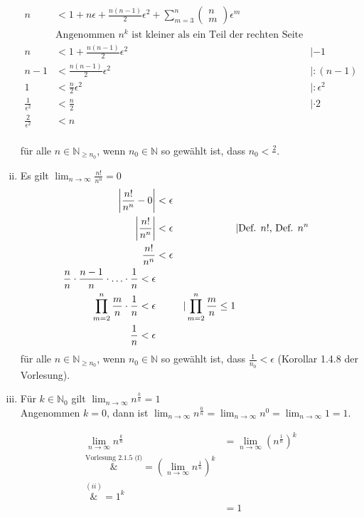 \documentclass{article}
\begin{document}
\begin{enumerate}[(i)]
\begin{align*}
    n &< 1 + n\epsilon + \frac{n(n - 1)}{2} \epsilon^2 + \sum\limits_{m = 3}^n \begin{pmatrix}n \\ m \end{pmatrix} \epsilon^m \\
                  & \text{Angenommen $n^k$ ist kleiner als ein Teil der rechten Seite} \\
    n &< 1 + \frac{n(n - 1)}{2} \epsilon^2 && | - 1 \\
    n - 1  &< \frac{n(n - 1)}{2} \epsilon^2 && | : (n - 1) \\
    1  &< \frac{n}{2} \epsilon^2 && | : \epsilon^2 \\
    \frac{1}{\epsilon^2}  &< \frac{n}{2} && | \cdot 2 \\
    \frac{2}{\epsilon^2}  &< n \\
  \end{align*}

  für alle $n \in \mathbb{N}_{\geq n_0}$, wenn $n_0 \in \mathbb{N}$ so gewählt ist, dass $n_0 < \frac{2}{}$.
\item Es gilt $\lim_{n \to \infty} \frac{n!}{n^n} = 0$
  \begin{align*}
    \abs{\frac{n!}{n^n} - 0} &< \epsilon \\
    \abs{\frac{n!}{n^n}} &< \epsilon && | \text{Def. $n!$, Def. $n^n$} \\
    \frac{n!}{n^n} &< \epsilon \\
    \frac{n}{n} \cdot \frac{n - 1}{n} \cdot \ldots \cdot \frac{1}{n} < \epsilon \\
    \prod\limits_{m=2}^{n}\frac{m}{n} \cdot \frac{1}{n} < \epsilon && | \prod\limits_{m=2}^{n}\frac{m}{n} \leq 1 \\
    \frac{1}{n} < \epsilon \\
  \end{align*}
  für alle $n \in \mathbb{N}_{\geq n_0}$, wenn $n_0 \in \mathbb{N}$ so gewählt ist, dass $\frac{1}{n_0} < \epsilon$ (Korollar 1.4.8 der Vorlesung).
\item Für $k \in \mathbb{N}_0$ gilt $\lim_{n \to \infty} n^{\frac{k}{n}} = 1$ \\
  Angenommen $k = 0$, dann ist $\lim_{n \to \infty} n^{\frac{0}{n}} = \lim_{n \to \infty} n^0 = \lim_{n \to \infty} 1 = 1$.

  \begin{align*}
    \lim_{n \to \infty} n^{\frac{k}{n}} &= \lim_{n \to \infty} \left(n^{\frac{1}{n}}\right)^k \\
    \overset{\text{Vorlesung 2.1.5 (f)}}&= \left( \lim_{n \to \infty} n^{\frac{1}{n}} \right)^k \\
    \overset{\hyperref[sec:1.2]{(ii)}}&= 1^k \\
                                        &= 1\\
  \end{align*}
  
\end{enumerate}
\end{document}
